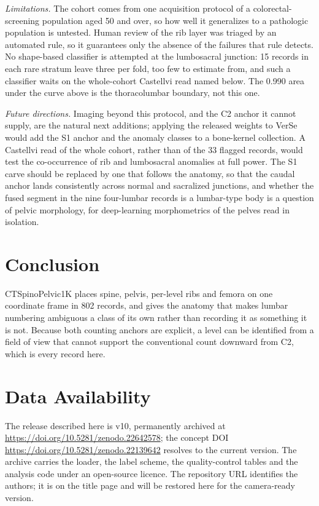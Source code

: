 \documentclass[aapm,mph,amsmath,amssymb,reprint]{revtex4-2}
\newcommand{\datasetdoi}{10.5281/zenodo.22139642}
\newcommand{\datasetversiondoi}{10.5281/zenodo.22642578}
\newcommand{\datasetversion}{v10}
\newif\ifreview \reviewtrue
\newcommand{\doiurl}[1]{\url{https://doi.org/#1}}
\begin{document}
\emph{Limitations.}\label{sec:limitations} The cohort comes from one acquisition protocol of a colorectal-screening population aged 50 and over, so how well it generalizes to a pathologic population is untested. Human review of the rib layer was triaged by an automated rule, so it guarantees only the absence of the failures that rule detects. No shape-based classifier is attempted at the lumbosacral junction: 15 records in each rare stratum leave three per fold, too few to estimate from, and such a classifier waits on the whole-cohort Castellvi read named below. The 0.990 area under the curve above is the thoracolumbar boundary, not this one. 

\emph{Future directions.} Imaging beyond this protocol, and the C2 anchor it cannot supply, are the natural next additions; applying the released weights to VerSe would add the S1 anchor and the anomaly classes to a bone-kernel collection. A Castellvi read of the whole cohort, rather than of the 33 flagged records, would test the co-occurrence of rib and lumbosacral anomalies at full power. The S1 carve should be replaced by one that follows the anatomy, so that the caudal anchor lands consistently across normal and sacralized junctions, and whether the fused segment in the nine four-lumbar records is a lumbar-type body is a question of pelvic morphology, for deep-learning morphometrics of the pelves read in isolation.

\section{Conclusion}

CTSpinoPelvic1K places spine, pelvis, per-level ribs and femora on one coordinate frame in
802 records, and gives the anatomy that makes lumbar numbering ambiguous a class of its own
rather than recording it as something it is not. Because both counting anchors are explicit,
a level can be identified from a field of view that cannot support the conventional count
downward from C2, which is every record here.

\section*{Data Availability}
The release described here is \datasetversion{}, permanently archived at
\doiurl{\datasetversiondoi}; the concept DOI \doiurl{\datasetdoi} resolves to the
current version.
The archive carries the loader, the label scheme, the quality-control tables and the
analysis code under an open-source licence. \ifreview The repository URL identifies the authors; it
is on the title page and will be restored here for the camera-ready version.\else Code:
\url{https://github.com/OpenSpineConsortium/CTSpinoPelvic1K}; convenience mirror:
\url{https://huggingface.co/datasets/OpenSpineConsortium/CTSpinoPelvic1K}.\fi
\end{document}
